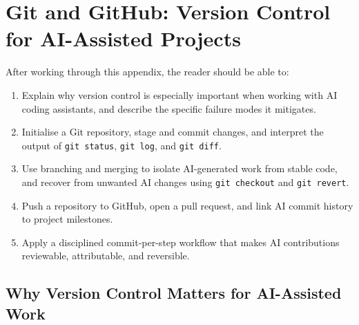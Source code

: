 \chapter{Git and GitHub: Version Control for AI-Assisted Projects}
\label{app:git}

\begin{remark}
After working through this appendix, the reader should be able to:
\begin{enumerate}
  \item Explain why version control is especially important when working with
        AI coding assistants, and describe the specific failure modes it mitigates.
  \item Initialise a Git repository, stage and commit changes, and interpret
        the output of \texttt{git status}, \texttt{git log}, and \texttt{git diff}.
  \item Use branching and merging to isolate AI-generated work from stable code,
        and recover from unwanted AI changes using \texttt{git checkout} and
        \texttt{git revert}.
  \item Push a repository to GitHub, open a pull request, and link AI commit
        history to project milestones.
  \item Apply a disciplined commit-per-step workflow that makes AI contributions
        reviewable, attributable, and reversible.
\end{enumerate}
\end{remark}

\section{Why Version Control Matters for AI-Assisted Work}
\label{app:git:why}

